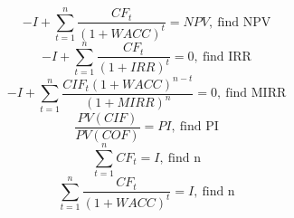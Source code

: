 \documentclass{article}
\begin{document}
\begin{equation}
    - I + \sum_{t=1}^{n} \frac{CF_t}{(1 + WACC)^t} = NPV, ~\text{find NPV}
\end{equation}
\begin{equation}
    - I + \sum_{t=1}^{n} \frac{CF_t}{(1 + IRR)^t} = 0 , ~\text{find IRR}
\end{equation}
\begin{equation}
    - I + \sum_{t=1}^{n} \frac{CIF_t(1 + WACC)^{n-t}}{(1 + MIRR)^n} = 0 ,~\text{find MIRR}
\end{equation}
\begin{equation}
    \frac{PV(CIF)}{PV(COF)} = PI ,~\text{find PI}
\end{equation}
\begin{equation}
    \sum_{t=1}^{n}CF_t = I , ~\text{find n}
\end{equation}
\begin{equation}
    \sum_{t=1}^{n} \frac{CF_t}{(1+WACC)^t} = I , ~\text{find n}
\end{equation}
\end{document}
